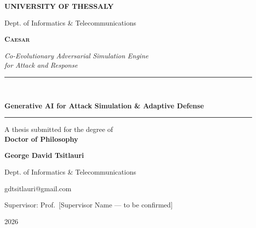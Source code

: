 \documentclass[12pt, a4paper, twoside, openright]{report}
\newcommand{\caesar}{\textsc{Caesar}}
\begin{document}
\begin{titlepage}
  \centering
  \vspace*{2cm}
  {\LARGE \textbf{UNIVERSITY OF THESSALY} \par}
  {\large Dept. of Informatics \& Telecommunications \par}
  \vspace{3cm}
  {\Huge \textbf{\caesar} \par}
  \vspace{0.8cm}
  {\Large \textit{Co-Evolutionary Adversarial Simulation Engine\\[4pt]
  for Attack and Response} \par}
  \vspace{1.5cm}
  \rule{0.6\textwidth}{0.5pt} \\[0.6cm]
  {\large \textbf{Generative AI for Attack Simulation \& Adaptive Defense} \par}
  \rule{0.6\textwidth}{0.5pt}
  \vspace{2cm}
  {\large A thesis submitted for the degree of\\[6pt]
  \textbf{Doctor of Philosophy} \par}
  \vspace{2cm}
  {\large \textbf{George David Tsitlauri} \par}
  {\normalsize Dept. of Informatics \& Telecommunications \par}
  {\normalsize gdtsitlauri@gmail.com \par}
  \vspace{0.5cm}
  {\normalsize Supervisor: Prof.\ [Supervisor Name --- to be confirmed] \par}
  \vfill
  {\large 2026 \par}
\end{titlepage}




\tableofcontents
\listoffigures
\listoftables
\listofalgorithms

\cleardoublepage
{}

















\appendix


\end{document}
